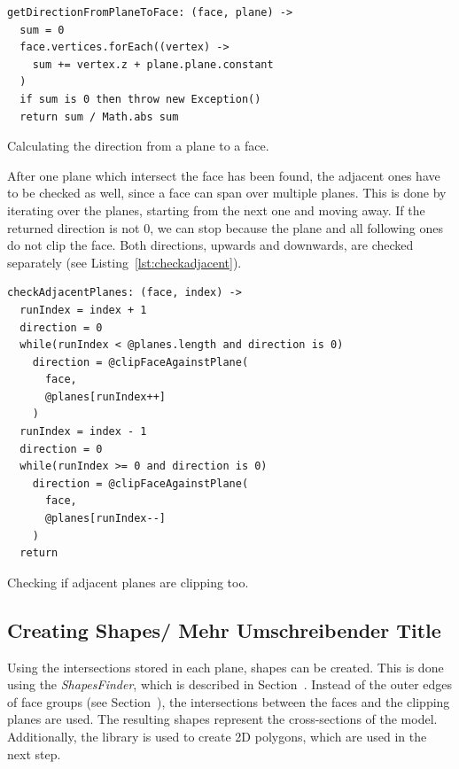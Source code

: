 \documentclass[../ClassicThesis.tex]{subfiles}
\begin{document}
\begin{listing}
\begin{verbatim}
getDirectionFromPlaneToFace: (face, plane) ->
  sum = 0
  face.vertices.forEach((vertex) ->
    sum += vertex.z + plane.plane.constant
  )
  if sum is 0 then throw new Exception()
  return sum / Math.abs sum
\end{verbatim}
\caption{Calculating the direction from a plane to a face.}
\label{lst:facedirection}
\end{listing}

After one plane which intersect the face has been found, the adjacent ones have to be checked as well, since a face can span over multiple planes. This is done by iterating over the planes, starting from the next one and moving away. If the returned direction is not 0, we can stop because the plane and all following ones do not clip the face. Both directions, upwards and downwards, are checked separately (see Listing~\ref{lst:checkadjacent}).

\begin{listing}
\begin{verbatim}
checkAdjacentPlanes: (face, index) ->
  runIndex = index + 1
  direction = 0
  while(runIndex < @planes.length and direction is 0)
    direction = @clipFaceAgainstPlane(
      face, 
      @planes[runIndex++]
    )
  runIndex = index - 1
  direction = 0
  while(runIndex >= 0 and direction is 0)
    direction = @clipFaceAgainstPlane(
      face, 
      @planes[runIndex--]
    )
  return
\end{verbatim}
\caption{Checking if adjacent planes are clipping too.}
\label{lst:checkadjacent}
\end{listing}

\subsection{Creating Shapes/ Mehr Umschreibender Title}

Using the intersections stored in each plane, shapes can be created. This is done using the \emph{ShapesFinder}, which is described in Section~. Instead of the outer edges of face groups (see Section~), the intersections between the faces and the clipping planes are used. The resulting shapes represent the cross-sections of the model. Additionally, the {\jsclipper} library is used to create 2D polygons, which are used in the next step.
\end{document}
